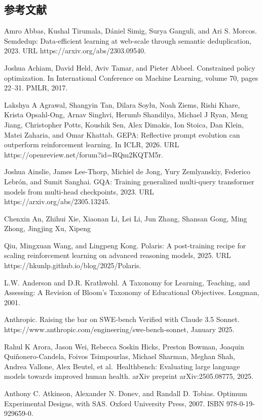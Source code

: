 \subsection{参考文献}\label{references}

Amro Abbas, Kushal Tirumala, Dániel Simig, Surya Ganguli, and Ari S.
Morcos. Semdedup: Data-efficient learning at web-scale through semantic
deduplication, 2023. URL https://arxiv.org/abs/2303.09540.

Joshua Achiam, David Held, Aviv Tamar, and Pieter Abbeel. Constrained
policy optimization. In International Conference on Machine Learning,
volume 70, pages 22--31. PMLR, 2017.

Lakshya A Agrawal, Shangyin Tan, Dilara Soylu, Noah Ziems, Rishi Khare,
Krista Opsahl-Ong, Arnav Singhvi, Herumb Shandilya, Michael J Ryan, Meng
Jiang, Christopher Potts, Koushik Sen, Alex Dimakis, Ion Stoica, Dan
Klein, Matei Zaharia, and Omar Khattab. GEPA: Reflective prompt
evolution can outperform reinforcement learning. In ICLR, 2026. URL
https://openreview.net/forum?id=RQm2KQTM5r.

Joshua Ainslie, James Lee-Thorp, Michiel de Jong, Yury Zemlyanskiy,
Federico Lebrón, and Sumit Sanghai. GQA: Training generalized
multi-query transformer models from multi-head checkpoints, 2023. URL
https://arxiv.org/abs/2305.13245.

Chenxin An, Zhihui Xie, Xiaonan Li, Lei Li, Jun Zhang, Shansan Gong,
Ming Zhong, Jingjing Xu, Xipeng



Qiu, Mingxuan Wang, and Lingpeng Kong. Polaris: A post-training recipe
for scaling reinforcement learning on advanced reasoning models, 2025.
URL https://hkunlp.github.io/blog/2025/Polaris.

L.W. Anderson and D.R. Krathwohl. A Taxonomy for Learning, Teaching,
and Assessing: A Revision of Bloom's Taxonomy of Educational Objectives.
Longman, 2001.

Anthropic. Raising the bar on SWE-bench Verified with Claude 3.5 Sonnet.
https://www.anthropic.com/engineering/swe-bench-sonnet, January 2025.

Rahul K Arora, Jason Wei, Rebecca Soskin Hicks, Preston Bowman, Joaquin
Quiñonero-Candela, Foivos Tsimpourlas, Michael Sharman, Meghan Shah,
Andrea Vallone, Alex Beutel, et al.~Healthbench: Evaluating large
language models towards improved human health. arXiv preprint
arXiv:2505.08775, 2025.

Anthony C. Atkinson, Alexander N. Donev, and Randall D. Tobias. Optimum
Experimental Designs, with SAS. Oxford University Press, 2007. ISBN
978-0-19-929659-0.


